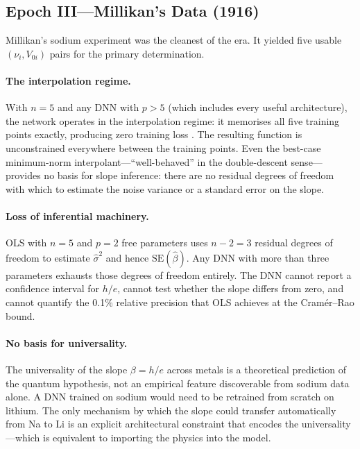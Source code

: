 \documentclass[12pt]{article}
\begin{document}
\subsection{Epoch III---Millikan's Data (1916)}
\label{sec:epochIII}

Millikan's sodium experiment was the cleanest of the era.  It yielded five
usable $(\nu_i, V_{0i})$ pairs for the primary determination.

\paragraph{The interpolation regime.}
With $n=5$ and any DNN with $p>5$ (which includes every
useful architecture), the network operates in the interpolation
regime: it memorises all five training points exactly,
producing zero training loss \citep{Belkin2019}.  The resulting
function is unconstrained everywhere between the training points.
Even the best-case minimum-norm interpolant---``well-behaved'' in the
double-descent sense---provides no basis for slope inference: there
are no residual degrees of freedom with which to estimate the noise
variance or a standard error on the slope.

\paragraph{Loss of inferential machinery.}
OLS with $n=5$ and $p=2$ free parameters uses $n-2=3$ residual
degrees of freedom to estimate $\hat\sigma^2$ and hence
$\mathrm{SE}(\hat\beta)$.  Any DNN with more than three parameters
exhausts those degrees of freedom entirely.  The DNN cannot report
a confidence interval for $h/e$, cannot test whether the slope
differs from zero, and cannot quantify the 0.1\% relative precision
that OLS achieves at the Cram\'er--Rao bound.

\paragraph{No basis for universality.}
The universality of the slope $\beta = h/e$ across metals is a
theoretical prediction of the quantum hypothesis, not an empirical
feature discoverable from sodium data alone.  A DNN trained on
sodium would need to be retrained from scratch on lithium.  The
only mechanism by which the slope could transfer automatically from
Na to Li is an explicit architectural constraint that encodes the
universality---which is equivalent to importing the physics into
the model.
\end{document}

